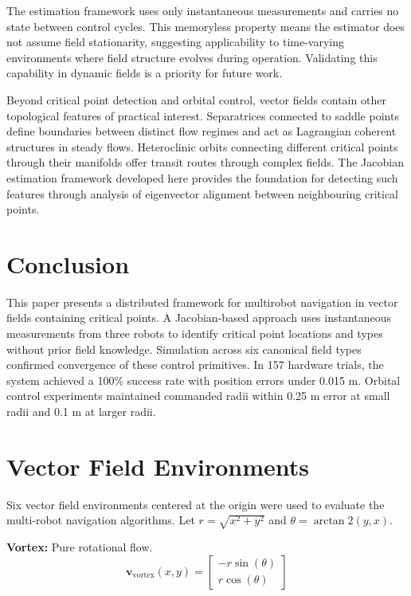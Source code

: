 \documentclass[lettersize,journal]{IEEEtran}
\begin{document}
The estimation framework uses only instantaneous measurements and carries no state between control cycles. This memoryless property means the estimator does not assume field stationarity, suggesting applicability to time-varying environments where field structure evolves during operation. Validating this capability in dynamic fields is a priority for future work.

Beyond critical point detection and orbital control, vector fields contain other topological features of practical interest. Separatrices connected to saddle points define boundaries between distinct flow regimes and act as Lagrangian coherent structures in steady flows. Heteroclinic orbits connecting different critical points through their manifolds offer transit routes through complex fields. The Jacobian estimation framework developed here provides the foundation for detecting such features through analysis of eigenvector alignment between neighbouring critical points.



\section{Conclusion}
\noindent

This paper presents a distributed framework for multirobot navigation in vector fields containing critical points. A Jacobian-based approach uses instantaneous measurements from three robots to identify critical point locations and types without prior field knowledge. Simulation across six canonical field types confirmed convergence of these control primitives. In 157 hardware trials, the system achieved a 100\% success rate with position errors under 0.015 m. Orbital control experiments maintained commanded radii within 0.25 m error at small radii and 0.1 m at larger radii.


\appendices

\section{Vector Field Environments}
\label{sec:appendix_vector_fields}

Six vector field environments centered at the origin were used to evaluate the multi-robot navigation algorithms. Let $r = \sqrt{x^2 + y^2}$ and $\theta = \arctan2(y, x)$.

\textbf{Vortex:} Pure rotational flow.
\begin{equation}
\mathbf{v}_{\text{vortex}}(x, y) = \begin{bmatrix} -r \sin(\theta) \\ r \cos(\theta) \end{bmatrix}
\end{equation}
\end{document}
